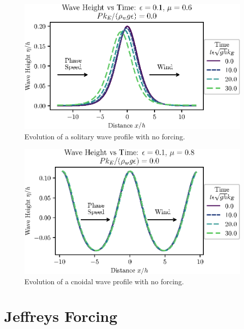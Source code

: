 \documentclass{jfm}
\let\Oldsection\section
\renewcommand{\section}{\FloatBarrier\Oldsection}
\begin{document}
\begin{figure}
  \centering
  \includegraphics{Long-Run.eps}
  \caption{
    Evolution of a solitary wave profile with no forcing.
  }
\end{figure}

\begin{figure}
  \centering
  \includegraphics{Long-Run-Cnoidal.eps}
  \caption{
    Evolution of a cnoidal wave profile with no forcing.
  }
\end{figure}

\section{Jeffreys Forcing}
\end{document}
